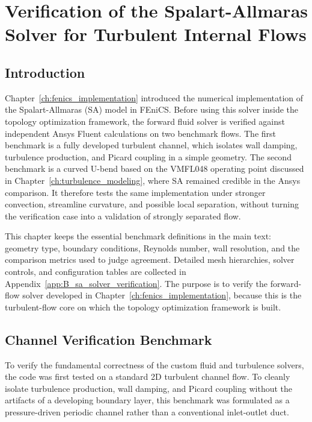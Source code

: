 \chapter{Verification of the Spalart-Allmaras Solver for Turbulent Internal Flows}
\label{ch:sa_verification}

\section{Introduction}
\label{sec:sa_verification_introduction}
Chapter~\ref{ch:fenics_implementation} introduced the numerical implementation of the Spalart-Allmaras (SA) model in FEniCS. Before using this solver inside the topology optimization framework, the forward fluid solver is verified against independent Ansys Fluent calculations on two benchmark flows. The first benchmark is a fully developed turbulent channel, which isolates wall damping, turbulence production, and Picard coupling in a simple geometry. The second benchmark is a curved U-bend based on the VMFL048 operating point discussed in Chapter~\ref{ch:turbulence_modeling}, where SA remained credible in the Ansys comparison. It therefore tests the same implementation under stronger convection, streamline curvature, and possible local separation, without turning the verification case into a validation of strongly separated flow.

This chapter keeps the essential benchmark definitions in the main text: geometry type, boundary conditions, Reynolds number, wall resolution, and the comparison metrics used to judge agreement. Detailed mesh hierarchies, solver controls, and configuration tables are collected in Appendix~\ref{app:B_sa_solver_verification}. The purpose is to verify the forward-flow solver developed in Chapter~\ref{ch:fenics_implementation}, because this is the turbulent-flow core on which the topology optimization framework is built.

\section{Channel Verification Benchmark}
\label{sec:sa_channel_verification}
To verify the fundamental correctness of the custom fluid and turbulence solvers, the code was first tested on a standard 2D turbulent channel flow. To cleanly isolate turbulence production, wall damping, and Picard coupling without the artifacts of a developing boundary layer, this benchmark was formulated as a pressure-driven periodic channel rather than a conventional inlet-outlet duct.

